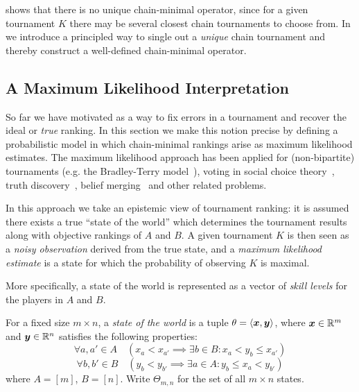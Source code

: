  shows that there is no unique chain-minimal operator, since for
a given tournament $K$ there may be several closest chain tournaments to choose
from. In  we introduce a principled way to
single out a \emph{unique} chain tournament and thereby construct a
well-defined chain-minimal operator.

\subsection{A Maximum Likelihood Interpretation}
\label{tourn_sec_mle}

So far we have motivated \chainmin{} as a way to fix
errors in a tournament and recover the ideal or \emph{true} ranking. In this
section we make this notion precise by defining a probabilistic model in which
chain-minimal rankings arise as maximum likelihood estimates.
%
The maximum likelihood approach has been applied for (non-bipartite)
tournaments (e.g. the Bradley-Terry
model~\cite{bradley_terry_52,gonzalez2014paired}), voting in social choice
theory~\cite{elkind2016rationalizations}, truth
discovery~\cite{wang_truth_2012}, belief merging~\cite{everaere2020} and other
related problems.

In this approach we take an epistemic view of tournament ranking: it is assumed
there exists a true ``state of the world'' which determines the tournament
results along with objective rankings of $A$ and $B$. A given
tournament $K$ is then seen as a \emph{noisy observation} derived from the
true state, and a \emph{maximum likelihood estimate} is a state for which the
probability of observing $K$ is maximal.

More specifically, a state of the world is represented as a vector of
\emph{skill levels} for the players in $A$ and $B$.\footnotemark{}


\begin{definition}
   \label{tourn_def_stateworld}

    For a fixed size $m \times n$, a \emph{state of the world} is a tuple
    $\theta = \langle {\bm{x}, \bm{y}} \rangle$, where $\bm{x} \in \mathbb{R}^m$ and
    $\bm{y} \in \mathbb{R}^n$ satisfies the following properties:
   \begin{equation}
        \forall a, a' \in A \quad (
            x_a < x_{a'} \implies \exists b \in B: x_a < y_b \le x_{a'}
        )
        \label{tourn_eqn_state_condition_a}
   \end{equation}
   \begin{equation}
        \forall b, b' \in B \quad(
            y_b < y_{b'} \implies \exists a \in A: y_b \le x_a < y_{b'}
        )
        \label{tourn_eqn_state_condition_b}
   \end{equation}
   where $A = [m]$, $B = [n]$. Write $\Theta_{m,n}$ for the set of all $m
   \times n$ states.

\end{definition}

